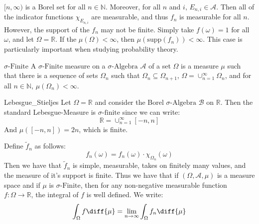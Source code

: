                 $[n,\infty)$ is a Borel set for all $n\in\mathbb{N}$.
                Moreover, for all $n$ and $i$, $E_{n,i}\in\mathcal{A}$.
                Then all of the indicator functions $\chi_{E_{n,i}}$ are
                measurable, and thus $f_{n}$ is measurable for all
                $n$. However, the support of the $f_{n}$ may not be
                finite. Simply take $f(\omega)=1$ for all $\omega$, and
                let $\Omega=\mathbb{R}$. If the $\mu(\Omega)<\infty$,
                then $\mu(\mathrm{supp}(f_{n}))<\infty$. This case is particularly
                important when studying probability theory.
                \begin{ldefinition}{$\sigma\textrm{-Finite}$}
                    A $\sigma\textrm{-Finite}$ measure on a
                    $\sigma\textrm{-Algebra}$ $\mathcal{A}$ of a set
                    $\Omega$ is a measure $\mu$ such that there is a
                    sequence of sets $\Omega_{n}$ such that
                    $\Omega_{n}\subseteq\Omega_{n+1}$,
                    $\Omega=\cup_{n=1}^{\infty}\Omega_{n}$, and for all
                    $n\in\mathbb{N}$, $\mu(\Omega_{n})<\infty$.
                \end{ldefinition}
                \begin{lexample}{}{Lebesgue_Stieljes}
                    Let $\Omega=\mathbb{R}$ and consider the Borel
                    $\sigma\textrm{-Algebra}$ $\mathcal{B}$ on
                    $\mathbb{R}$. Then the standard Lebesgue-Measure
                    is $\sigma\textrm{-finite}$ since we can write:
                    \begin{equation}
                        \mathbb{R}=\cup_{n=1}^{\infty}[-n,n]
                    \end{equation}
                    And $\mu([-n,n])=2n$, which is finite.
                \end{lexample}
                Define $\tilde{f}_{n}$ as follows:
                \begin{equation}
                    f_{n}(\omega)
                    =f_{n}(\omega)\cdot\chi_{\Omega_{n}}(\omega)
                \end{equation}
                Then we have that $\tilde{f}_{n}$ is simple, measurable,
                takes on finitely many values, and the measure of it's
                support is finite. Thus we have that if
                $(\Omega,\mathcal{A},\mu)$ is a measure space and if
                $\mu$ is $\sigma\textrm{-Finite}$, then for any
                non-negative measurable function
                $f:\Omega\rightarrow\mathbb{R}$, the integral of $f$ is
                well defined. We write:
                \begin{equation}
                    \int_{\Omega}f\diff{\mu}=
                    \underset{n\rightarrow\infty}{\lim}
                    \int_{\Omega}f_{n}\diff{\mu}
                \end{equation}
